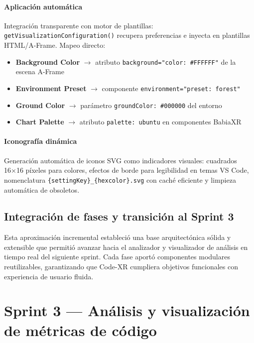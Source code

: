 \documentclass[a4paper, 12pt]{book}
\begin{document}
\paragraph{Aplicación automática}
Integración transparente con motor de plantillas: \texttt{getVisualizationConfiguration()} recupera preferencias e inyecta en plantillas HTML/A-Frame. Mapeo directo:
\begin{itemize}
\item \textbf{Background Color} $\rightarrow$ atributo \texttt{background="color: \#FFFFFF"} de la escena A-Frame
\item \textbf{Environment Preset} $\rightarrow$ componente \texttt{environment="preset: forest"} 
\item \textbf{Ground Color} $\rightarrow$ parámetro \texttt{groundColor: \#000000} del entorno
\item \textbf{Chart Palette} $\rightarrow$ atributo \texttt{palette: ubuntu} en componentes BabiaXR
\end{itemize}

\paragraph{Iconografía dinámica}
Generación automática de iconos SVG como indicadores visuales: cuadrados 16×16 píxeles para colores, efectos de borde para legibilidad en temas VS Code, nomenclatura \texttt{\{settingKey\}\_\{hexcolor\}.svg} con caché eficiente y limpieza automática de obsoletos.

\subsection{Integración de fases y transición al Sprint 3}
Esta aproximación incremental estableció una base arquitectónica sólida y extensible que permitió avanzar hacia el analizador y visualizador de análisis en tiempo real del siguiente sprint. Cada fase aportó componentes modulares reutilizables, garantizando que Code-XR cumpliera objetivos funcionales con experiencia de usuario fluida.

\section{Sprint 3 — Análisis y visualización de métricas de código}
\end{document}

